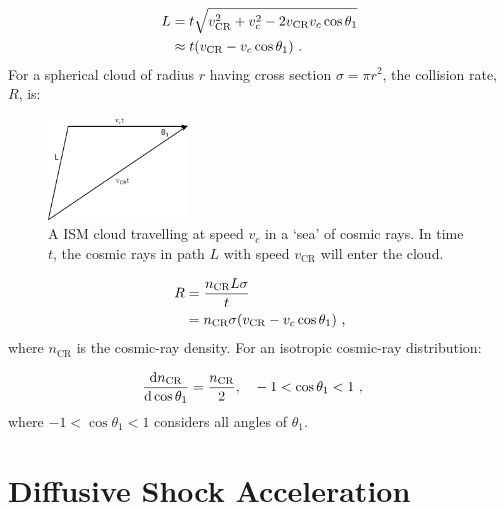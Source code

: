 \begin{equation}
    \begin{aligned}
        L&=t\sqrt{v_\text{CR}^2+v_c^2-2v_\text{CR}v_c\cos\theta_1} \\
        &\approx t\qty(v_\text{CR}-v_c\cos\theta_1) \text{ .}
    \end{aligned}
\end{equation}
\noindent For a spherical cloud of radius $r$ having cross section $\sigma=\pi r^2$, the collision rate, $R$, is:
\begin{figure}
    \centering
    \includegraphics[width=0.33\textwidth]{A3_Diffusive_Shock_Acceleration/Images/fermi_original_theta1.png}
    \caption{A ISM cloud travelling at speed $v_c$ in a `sea' of cosmic rays. In time $t$, the cosmic rays in path $L$ with speed $v_\text{CR}$ will enter the cloud.}
    \label{fig:A3_fermi_origin_theta1}
\end{figure}
\begin{equation}
    \begin{aligned}
        R&=\frac{n_\text{CR}L\sigma}{t} \\
        &=n_\text{CR}\sigma\qty(v_\text{CR}-v_c\cos\theta_1) \text { ,}
    \end{aligned}
\end{equation}
\noindent where $n_\text{CR}$ is the cosmic-ray density. For an isotropic cosmic-ray distribution:

\begin{equation}
    \begin{aligned}
        \dv{n_\text{CR}}{\cos\theta_1}&=\frac{n_\text{CR}}{2}\text{,}\quad -1<\cos\theta_1<1\text{ ,}
    \end{aligned}
\end{equation}
\noindent where $-1<\cos\theta_1<1$ considers all angles of $\theta_1$.

\section{Diffusive Shock Acceleration}

